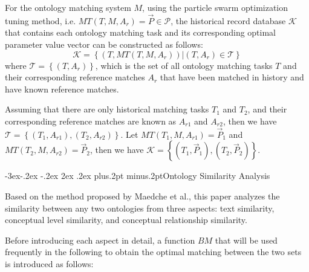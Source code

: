 \documentclass[twoside]{article}
\makeatletter
\def\subsection{\@startsection{subsection}{2}{\z@}%
 {-3ex\@plus -.2ex \@minus -.2ex}%
 {2ex \@plus.2ex}%
{\normalfont\normalsize\protect\baselineskip=12.5pt plus.2pt minus.2pt\bfseries}}
\makeatother
\begin{document}
For the ontology matching system $M$, using the particle swarm optimization tuning method, i.e. $M T\left(T, M, A_{r}\right)=\vec{P} \in \mathcal{P}$, the historical record database $\mathcal{K}$ that contains each ontology matching task and its corresponding optimal parameter value vector can be constructed as follows:
$$
\mathcal{K}=\left\{\left(T, M T\left(T, M, A_{r}\right)\right) |\left(T, A_{r}\right) \in \mathcal{T}\right\}
$$
where $\mathcal{T}=\left\{\left(T, A_{r}\right)\right\}$, which is the set of all ontology matching tasks $T$ and their corresponding reference matches $A_{r}$ that have been matched in history and have known reference matches.

Assuming that there are only historical matching tasks ${T_{1}}$ and ${T_{2}}$,
and their corresponding reference matches are known as ${A_{r 1}}$ and ${A_{r 2}}$,
then we have $\mathcal{T}=\left\{\left(T_{1}, A_{r 1}\right),\left(T_{2}, A_{r 2}\right)\right\}$.
Let $M T\left(T_{1}, M, A_{r 1}\right)=\vec{P}_{1}$ and $M T\left(T_{2}, M, A_{r 2}\right)=\vec{P}_{2}$,
then we have $\mathcal{K}=\left\{\left(T_{1}, \vec{P}_{1}\right),\left(T_{2}, \vec{P}_{2}\right)\right\}$.

\subsection{Ontology Similarity Analysis}

Based on the method proposed by Maedche et al.\cite{wwy51}, this paper analyzes the similarity between any two ontologies from three aspects: text similarity, conceptual level similarity, and conceptual relationship similarity.

Before introducing each aspect in detail, a function $BM$ that will be used frequently in the following to obtain the optimal matching between the two sets is introduced as follows:
\end{document}
